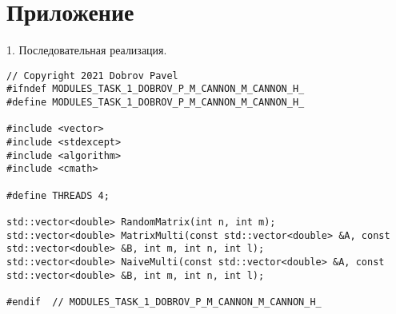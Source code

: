 \documentclass{report}
\begin{document}
\section*{Приложение}
\par 1. Последовательная реализация.
\begin{lstlisting}
// Copyright 2021 Dobrov Pavel
#ifndef MODULES_TASK_1_DOBROV_P_M_CANNON_M_CANNON_H_
#define MODULES_TASK_1_DOBROV_P_M_CANNON_M_CANNON_H_

#include <vector>
#include <stdexcept>
#include <algorithm>
#include <cmath>

#define THREADS 4;

std::vector<double> RandomMatrix(int n, int m);
std::vector<double> MatrixMulti(const std::vector<double> &A, const std::vector<double> &B, int m, int n, int l);
std::vector<double> NaiveMulti(const std::vector<double> &A, const std::vector<double> &B, int m, int n, int l);

#endif  // MODULES_TASK_1_DOBROV_P_M_CANNON_M_CANNON_H_
\end{lstlisting}
\end{document}
